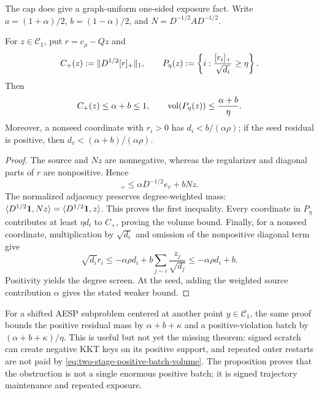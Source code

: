 The cap does give a graph-uniform one-sided exposure fact.  Write
$a=(1+\alpha)/2$, $b=(1-\alpha)/2$, and
$N=D^{-1/2}AD^{-1/2}$.

\begin{proposition}
\label{prop:two-stage-mass-cap-positive-exposure}
For $z\in\mathcal C_1$, put $r=c_\rho-Qz$ and
\begin{equation*}
 C_+(z):=\lVert D^{1/2}[r]_+\rVert_1,
 \qquad
 P_\eta(z):=\left\{i:\frac{[r_i]_+}{\sqrt{d_i}}\geq\eta\right\}.
\end{equation*}
Then
\begin{equation}
 C_+(z)\leq\alpha+b\leq1,
 \qquad
 \operatorname{vol}(P_\eta(z))\leq\frac{\alpha+b}{\eta}.
 \label{eq:two-stage-positive-batch-volume}
\end{equation}
Moreover, a nonseed coordinate with $r_i>0$ has
$d_i<b/(\alpha\rho)$; if the seed residual is positive, then
$d_v<(\alpha+b)/(\alpha\rho)$.
\end{proposition}

\begin{proof}
The source and $Nz$ are nonnegative, whereas the regularizer and diagonal
parts of $r$ are nonpositive.  Hence
\begin{equation*}
 [r]_+\leq \alpha D^{-1/2}e_v+bNz.
\end{equation*}
The normalized adjacency preserves degree-weighted mass:
$\langle D^{1/2}\mathbf{1},Nz\rangle=\langle D^{1/2}\mathbf{1},z\rangle$.
This proves the first inequality.  Every coordinate in $P_\eta$ contributes
at least $\eta d_i$ to $C_+$, proving the volume bound.  Finally, for a
nonseed coordinate, multiplication by $\sqrt{d_i}$ and omission of the
nonpositive diagonal term give
\begin{equation*}
 \sqrt{d_i}r_i
 \leq-\alpha\rho d_i
     +b\sum_{j\sim i}\frac{z_j}{\sqrt{d_j}}
 \leq-\alpha\rho d_i+b.
\end{equation*}
Positivity yields the degree screen.  At the seed, adding the weighted source
contribution $\alpha$ gives the stated weaker bound.
\end{proof}

For a shifted AESP subproblem centered at another point $y\in\mathcal C_1$,
the same proof bounds the positive residual mass by $\alpha+b+\kappa$ and a
positive-violation batch by $(\alpha+b+\kappa)/\eta$.  This is useful but not
yet the missing theorem: signed scratch can create negative KKT keys on its
positive support, and repeated outer restarts are not paid by
\cref{eq:two-stage-positive-batch-volume}.  The proposition proves that the
obstruction is not a single enormous positive batch; it is signed trajectory
maintenance and repeated exposure.

